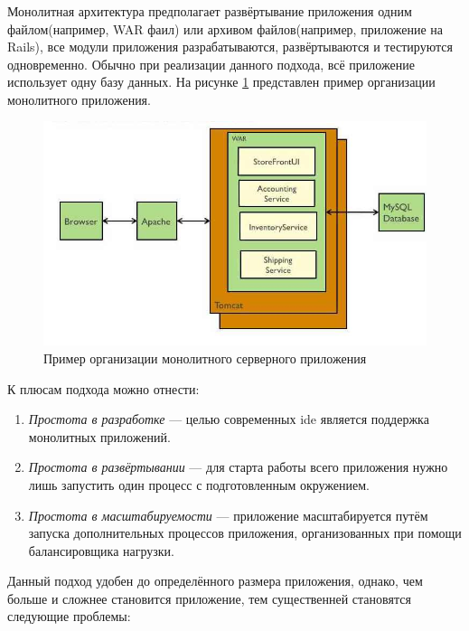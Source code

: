 \subsubsection {}
Монолитная архитектура предполагает развёртывание приложения одним файлом(например, WAR фаил) или архивом файлов(например, приложение на Rails), все модули приложения разрабатываются, развёртываются и тестируются одновременно. Обычно при реализации данного подхода, всё приложение использует одну базу данных. На рисунке \ref{sec:analysis:research:arch:back:monolith} представлен пример организации монолитного приложения. \cite{microservices:ma}

\begin{figure}[h]
  \centering
    \includegraphics[width=1\textwidth]{inc/img/backend-monolith.jpg}
  \caption{Пример организации монолитного серверного приложения}
  \label{sec:analysis:research:arch:back:monolith}
\end{figure}

К плюсам подхода можно отнести:

\begin{enumerate}
	\item \emph{Простота в разработке} --- целью современных \gls{ide} является поддержка монолитных приложений.
	\item \emph{Простота в развёртывании} --- для старта работы всего приложения нужно лишь запустить один процесс с подготовленным окружением.
	\item \emph{Простота в масштабируемости} --- приложение масштабируется путём запуска дополнительных процессов приложения, организованных при помощи балансировщика нагрузки.
\end{enumerate}

Данный подход удобен до определённого размера приложения, однако, чем больше и сложнее становится приложение, тем существенней становятся следующие проблемы:

